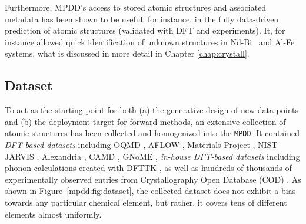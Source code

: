 Furthermore, MPDD's access to stored atomic structures and associated metadata has been shown to be useful, for instance, in the fully data-driven prediction of atomic structures (validated with DFT and experiments). It, for instance allowed quick identification of unknown structures in Nd-Bi~\cite{Im2022ThermodynamicModeling} and Al-Fe~\cite{Shang2021FormingJoints} systems, what is discussed in more detail in Chapter \ref{chap:crystall}.


\subsection{Dataset} \label{mpdd:ssec:dataset}

To act as the starting point for both (a) the generative design of new data points and (b) the deployment target for forward methods, an extensive collection of atomic structures has been collected and homogenized into the \texttt{MPDD}. It contained \textit{DFT-based datasets} including OQMD \cite{Saal2013MaterialsOQMD, Kirklin2015TheEnergies, Shen2022ReflectionsOQMD}, AFLOW \cite{Curtarolo2013AFLOW:Discovery, Toher2018TheDiscovery}, Materials Project \cite{Jain2013Commentary:Innovation}, NIST-JARVIS \cite{Choudhary2020TheDesign}, Alexandria \cite{Schmidt2022AFunctionals}, CAMD \cite{Ye2022NovelAgents}, GNoME \cite{Merchant2023ScalingDiscovery}, \textit{in-house DFT-based datasets} including phonon calculations created with DFTTK \cite{Wang2021DFTTK:Calculations}, as well as hundreds of thousands of experimentally observed entries from Crystallography Open Database (COD) \cite{Grazulis2009CrystallographyStructures, Grazulis2012CrystallographyCollaboration, Grazulis2019CrystallographyPerspectives}. As shown in Figure~\ref{mpdd:fig:dataset}, the collected dataset does not exhibit a bias towards any particular chemical element, but rather, it covers tens of different elements almost uniformly.

